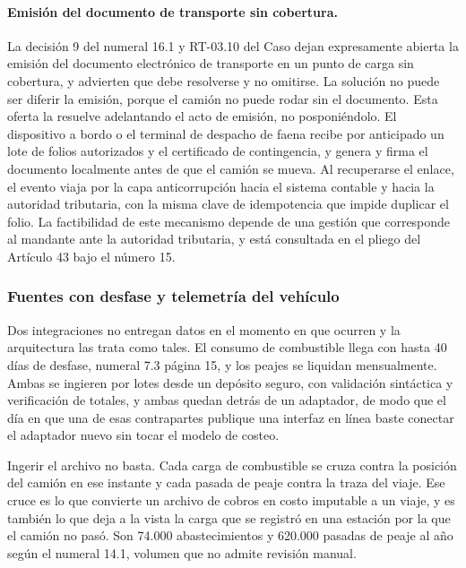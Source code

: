 \paragraph{Emisión del documento de transporte sin cobertura.} La decisión 9 del numeral 16.1 y
RT-03.10 del Caso dejan expresamente abierta la emisión del documento electrónico de transporte en
un punto de carga sin cobertura, y advierten que debe resolverse y no omitirse. La solución no puede
ser diferir la emisión, porque el camión no puede rodar sin el documento. Esta oferta la resuelve
adelantando el acto de emisión, no posponiéndolo. El dispositivo a bordo o el terminal de despacho
de faena recibe por anticipado un lote de folios autorizados y el certificado de contingencia, y
genera y firma el documento localmente antes de que el camión se mueva. Al recuperarse el enlace, el
evento viaja por la capa anticorrupción hacia el sistema contable y hacia la autoridad tributaria,
con la misma clave de idempotencia que impide duplicar el folio. La factibilidad de este mecanismo
depende de una gestión que corresponde al mandante ante la autoridad tributaria, y está consultada
en el pliego del Artículo 43 bajo el número 15.


\subsubsection{Fuentes con desfase y telemetría del vehículo}

Dos integraciones no entregan datos en el momento en que ocurren y la arquitectura las trata como
tales. El consumo de combustible llega con hasta 40 días de desfase, numeral 7.3 página 15, y los
peajes se liquidan mensualmente. Ambas se ingieren por lotes desde un depósito seguro, con
validación sintáctica y verificación de totales, y ambas quedan detrás de un adaptador, de modo que
el día en que una de esas contrapartes publique una interfaz en línea baste conectar el adaptador
nuevo sin tocar el modelo de costeo.

Ingerir el archivo no basta. Cada carga de combustible se cruza contra la posición del camión en
ese instante y cada pasada de peaje contra la traza del viaje. Ese cruce es lo que convierte un
archivo de cobros en costo imputable a un viaje, y es también lo que deja a la vista la carga que
se registró en una estación por la que el camión no pasó. Son 74.000 abastecimientos y 620.000
pasadas de peaje al año según el numeral 14.1, volumen que no admite revisión manual.

